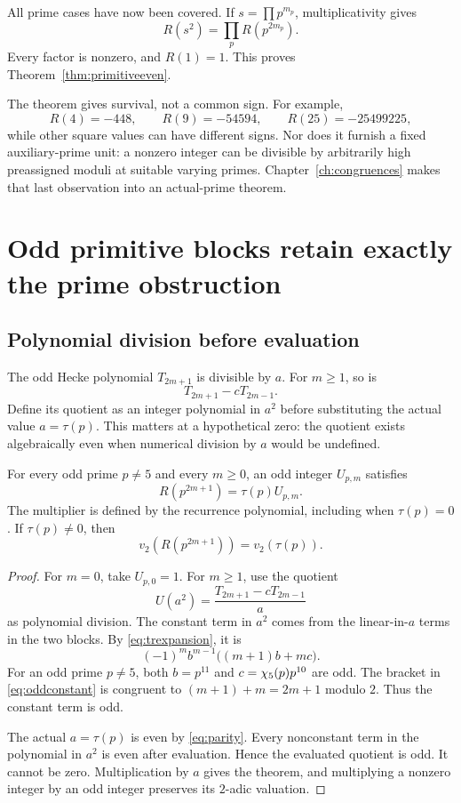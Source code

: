 All prime cases have now been covered. If $s=\prod p^{m_p}$, multiplicativity gives
\[
R(s^2)=\prod_pR(p^{2m_p}).
\]
Every factor is nonzero, and $R(1)=1$. This proves Theorem~\ref{thm:primitiveeven}.

The theorem gives survival, not a common sign. For example,
\[
R(4)=-448,\qquad R(9)=-54594,\qquad R(25)=-25499225,
\]
while other square values can have different signs. Nor does it furnish a fixed auxiliary-prime unit: a nonzero integer can be divisible by arbitrarily high preassigned moduli at suitable varying primes. Chapter~\ref{ch:congruences} makes that last observation into an actual-prime theorem.


\chapter{Odd primitive blocks retain exactly the prime obstruction}\label{ch:odd}
\section{Polynomial division before evaluation}
The odd Hecke polynomial $T_{2m+1}$ is divisible by $a$. For $m\ge1$, so is
\[
T_{2m+1}-cT_{2m-1}.
\]
Define its quotient as an integer polynomial in $a^2$ before substituting the actual value $a=\tau(p)$. This matters at a hypothetical zero: the quotient exists algebraically even when numerical division by $a$ would be undefined.

\begin{theorem}\label{thm:oddmultiplier}
For every odd prime $p\ne5$ and every $m\ge0$, an odd integer $U_{p,m}$ satisfies
\[
R(p^{2m+1})=\tau(p)U_{p,m}.
\]
The multiplier is defined by the recurrence polynomial, including when $\tau(p)=0$. If $\tau(p)\ne0$, then
\[
v_2(R(p^{2m+1}))=v_2(\tau(p)).
\]
\end{theorem}
\begin{proof}
For $m=0$, take $U_{p,0}=1$. For $m\ge1$, use the quotient
\[
U(a^2)=\frac{T_{2m+1}-cT_{2m-1}}a
\]
as polynomial division. The constant term in $a^2$ comes from the linear-in-$a$ terms in the two blocks. By \eqref{eq:trexpansion}, it is
\begin{equation}\label{eq:oddconstant}
(-1)^mb^{m-1}\bigl((m+1)b+mc\bigr).
\end{equation}
For an odd prime $p\ne5$, both $b=p^{11}$ and $c=\chi_5(p)p^{10}$ are odd. The bracket in \eqref{eq:oddconstant} is congruent to $(m+1)+m=2m+1$ modulo $2$. Thus the constant term is odd.

The actual $a=\tau(p)$ is even by \eqref{eq:parity}. Every nonconstant term in the polynomial in $a^2$ is even after evaluation. Hence the evaluated quotient is odd. It cannot be zero. Multiplication by $a$ gives the theorem, and multiplying a nonzero integer by an odd integer preserves its $2$-adic valuation.
\end{proof}

